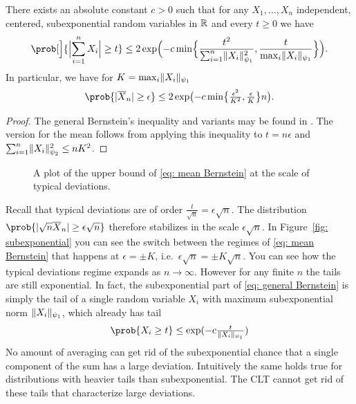 \begin{mdframed}[innertopmargin=0pt]
\begin{theorem}
    There exists an absolute constant \(c>0\) such that
    for any \(X_1, \dots, X_n\) independent, centered, subexponential random variables in \(\mathbb{R}\)
    and every \(t\ge 0\) we have
    \begin{equation}
        \label{eq: general Bernstein}
        \prob[\Big]{\abs[\Big]{\sum_{i=1}^n X_i} \ge t}
        \le 2 \exp\Bigl(-c \min\set[\Big]{\frac{t^2}{\sum_{i=1}^n \norm{X_i}_{\psi_1}^2}, \frac{t}{\max_{i} \norm{X_i}_{\psi_1} }}\Bigr).
    \end{equation}
    In particular, we have for \(K= \max_{i} \lVert X_i\rVert_{\psi_1}\)
    \begin{equation}
        \label{eq: mean Bernstein}        
        \prob{\abs{\mean{X}_n} \ge \epsilon}
        \le 2 \exp\bigl(-c \min\set[\big]{\tfrac{\epsilon^2}{K^2}, \tfrac{\epsilon}{K}}n\bigr).
    \end{equation}
\end{theorem}
\end{mdframed}

\begin{proof}
    The general Bernstein's inequality and variants may be found in \citep[Thm.~2.8.1]{vershyninHighDimensionalProbabilityIntroduction2018}.
    The version for the mean follows from applying this inequality to \(t=n\epsilon\)
    and \(\sum_{i=1}^n \lVert X_i\rVert_{\psi_2}^2 \le nK^2\).
\end{proof}

\begin{figure}
    \centering
    
    \caption{
        A plot of the upper bound of \eqref{eq: mean Bernstein} at the
        scale of typical deviations.
    }
    \label{fig: subexponential}
\end{figure}
\begin{remark}
    Recall that typical deviations are of order \(\frac{t}{\sqrt{n}}=\epsilon\sqrt{n}\).
    The distribution \(\prob{\abs{\sqrt{n}\mean{X}_n} \ge \epsilon \sqrt{n}}\)
    therefore stabilizes in the scale \(\epsilon\sqrt{n}\). In Figure~\ref{fig:
    subexponential} you can see the switch
    between the regimes of \eqref{eq: mean Bernstein} that happens at \(\epsilon =
    \pm K\), i.e.\ \(\epsilon\sqrt{n} = \pm K\sqrt{n}\). You can see how the typical deviations
    regime expands as \(n\to\infty\). However for any finite \(n\) the tails
    are still exponential. In fact, the subexponential part of
    \eqref{eq: general Bernstein} is simply the tail of a single random
    variable \(X_i\) with maximum subexponential norm \(\lVert X_i\rVert_{\psi_1}\),
    which already has tail
    \[
        \prob{X_i \ge t} \le \exp(-c \tfrac{t}{\norm{X_i}_{\psi_1}})
    \]
    No amount of averaging can get rid of the subexponential chance that a single component
    of the sum has a large deviation. Intuitively the same holds true
    for distributions with heavier tails than subexponential. The CLT
    cannot get rid of these tails that characterize large deviations.
\end{remark}


